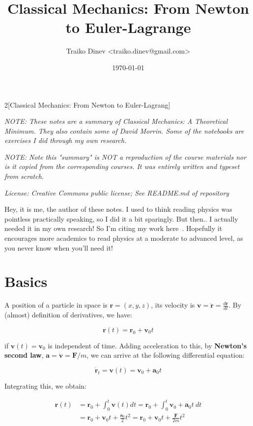 \documentclass{article}
\title{Classical Mechanics: From Newton to Euler-Lagrange}
\date{\today}
\author{Traiko Dinev \textless traiko.dinev@gmail.com\textgreater}
\begin{document}
\begin{multicols}{2}[Classical Mechanics: From Newton to Euler-Lagrang]
\maketitle
\textit{NOTE: These notes are a summary of Classical Mechanics: A Theoretical Minimum. They also contain some of David Morrin. Some of the notebooks are exercises I did through my own research.}

\textit{NOTE: Note this "summary" is NOT a reproduction of the course materials nor is it copied from the corresponding courses. It was entirely written and typeset from scratch.}

\textit{License: Creative Commons public license; See README.md of repository}

Hey, it is me, the author of these notes. I used to think reading physics was pointless practically speaking, so I did it a bit sparingly. But then.. I actually needed it in my own research! So I'm citing my work here~\cite{dinev2020modeling}. Hopefully it encourages more academics to read physics at a moderate to advanced level, as you never know when you'll need it!


\section{Basics}
A position of a particle in space is $\bm{r} = (x, y, z)$, its velocity is $\bm{v} = \dot{\bm{r}} = \frac{d\bm{r}}{d t}$. By (almost) definition of derivatives, we have:

\begin{equation}
    \bm{r}(t) = \bm{r}_0 + \bm{v}_0 t
\end{equation}

if $\bm{v}(t) = \bm{v}_0$ is independent of time. Adding acceleration to this, by \textbf{Newton's second law}, $\bm{a} = \dot{\bm{v}} = \bm{F}/m$, we can arrive at the following differential equation:

\begin{equation}
    \dot{\bm{r}}_t = \bm{v}(t) = \bm{v}_0 + \bm{a}_0 t
\end{equation}

Integrating this, we obtain:

\begin{align}
    \bm{r}(t) &= \bm{r}_0 + \int_0^t \bm{v}(t) dt = \bm{r}_0 +  \int_0^t \bm{v}_0 + \bm{a}_0 t\ dt \\
    &= \bm{r}_0 + \bm{v}_0 t + \frac{\bm{a}_0}{2} t^2 = \bm{r}_0 +  \bm{v}_0 t + \frac{\bm{F}}{2m} t^2
\end{align}


\end{multicols}
\end{document}
